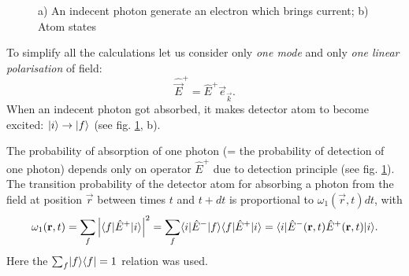 \begin{figure}[h!]
	\begin{minipage}[h]{0.49\linewidth}
	\end{minipage}
	\hfill
	\begin{minipage}[h]{0.49\linewidth}
	\end{minipage}
	\caption{a) An indecent photon generate an electron which brings current; b) Atom states}
	\label{fig:dec}
\end{figure}


To simplify all the calculations let us consider only \textit{one mode} and only \textit{one linear polarisation} of field:
\begin{equation}
	\hat{\vec{E}}^+ = \hat{E}^+ \vec{e}_{\vec{k}}.
\end{equation}
When an indecent photon got absorbed, it makes detector atom to become excited: $\lvert i\rangle \to \lvert f\rangle$ (see fig. \ref{fig:dec}, b).


The probability of  absorption of one photon (= the probability of detection of one photon) depends only on operator $\hat{E}^+$ due to detection principle (see fig. \ref{fig:dec}). The transition probability of the detector atom for absorbing a photon from the field at position $\vec{r}$ between times $t$ and $t+dt$ is proportional to $\omega_1(\vec{r},t) dt$, with
\begin{equation}
	\omega_1 (\mathbf{r}, t) = \sum_{f} \left| \langle f\rvert \hat{E}^{+} \lvert i\rangle \right|^2 = \sum_{f} \langle i\rvert \hat{E}^{-} \lvert f\rangle \langle f\rvert \hat{E}^{+} \lvert i\rangle = \langle i\rvert \hat{E}^-(\mathbf{r},t) \hat{E}^+ (\mathbf{r},t) \lvert i\rangle.
\end{equation}
Here the $\sum_{f} \lvert f\rangle \langle f\rvert = 1$ relation was used.

